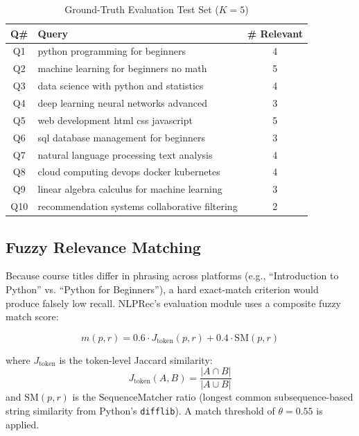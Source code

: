 \documentclass[12pt, a4paper]{article}
\begin{document}
\begin{table}[htbp]
\centering
\caption{Ground-Truth Evaluation Test Set ($K=5$)}
\label{tab:testset}
\renewcommand{\arraystretch}{1.25}
\begin{tabular}{clc}
\toprule
\textbf{Q\#} & \textbf{Query} & \textbf{\# Relevant} \\
\midrule
Q1  & python programming for beginners              & 4 \\
Q2  & machine learning for beginners no math        & 5 \\
Q3  & data science with python and statistics       & 4 \\
Q4  & deep learning neural networks advanced        & 3 \\
Q5  & web development html css javascript           & 5 \\
Q6  & sql database management for beginners         & 3 \\
Q7  & natural language processing text analysis     & 4 \\
Q8  & cloud computing devops docker kubernetes      & 4 \\
Q9  & linear algebra calculus for machine learning  & 3 \\
Q10 & recommendation systems collaborative filtering & 2 \\
\bottomrule
\end{tabular}
\end{table}

\subsection{Fuzzy Relevance Matching}

Because course titles differ in phrasing across platforms (e.g., ``Introduction to Python'' vs.
``Python for Beginners''), a hard exact-match criterion would produce falsely low recall.
NLPRec's evaluation module uses a composite fuzzy match score:

\begin{equation}
    m(p, r) = 0.6 \cdot J_{\text{token}}(p, r) + 0.4 \cdot \text{SM}(p, r)
    \label{eq:fuzzymatch}
\end{equation}

where $J_{\text{token}}$ is the token-level Jaccard similarity:
\begin{equation}
    J_{\text{token}}(A, B) = \frac{|A \cap B|}{|A \cup B|}
    \label{eq:jaccard}
\end{equation}
and $\text{SM}(p, r)$ is the SequenceMatcher ratio (longest common subsequence-based string
similarity from Python's \texttt{difflib}). A match threshold of $\theta = 0.55$ is applied.
\end{document}
